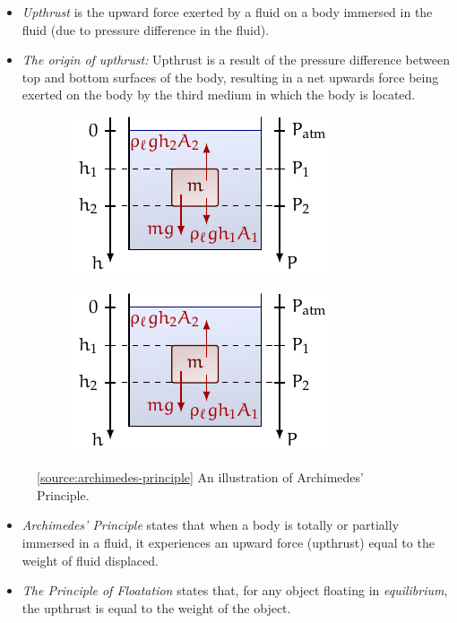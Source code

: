 \documentclass[oneside]{book}
\begin{document}
\begin{itemize}
    \item \emph{Upthrust} is the upward force exerted by a fluid on a body immersed in the fluid (due to pressure difference in the fluid).
    \item \emph{The origin of upthrust:} Upthrust is a result of the pressure difference between top and bottom surfaces of the body, resulting in a net upwards force being exerted on the body by the third medium in which the body is located.
\end{itemize}
\begin{minipage}{0.5\textwidth}
    \begin{figure}[H]
        \centering
        \begin{subfigure}[c]{0.5\textwidth}
            \centering
            \includegraphics[page=3]{../images/Upthrust/Upthrust.pdf}
        \end{subfigure}%
        \begin{subfigure}[c]{0.5\textwidth}
            \centering
            \vspace{1cm}
            \includegraphics[page=4]{../images/Upthrust/Upthrust.pdf}
        \end{subfigure}%
        \caption{\ref{source:archimedes-principle} An illustration of Archimedes' Principle.}
        \label{fig:archimedes-principle}
    \end{figure}
\end{minipage}%
\begin{minipage}{0.5\textwidth}
    \begin{itemize}
        \item \emph{Archimedes' Principle} states that when a body is totally or partially immersed in a fluid, it experiences an upward force (upthrust) equal to the weight of fluid displaced.
        \item \emph{The Principle of Floatation} states that, for any object floating in \emph{equilibrium}, the upthrust is equal to the weight of the object.
    \end{itemize}
\end{minipage}
\end{document}
